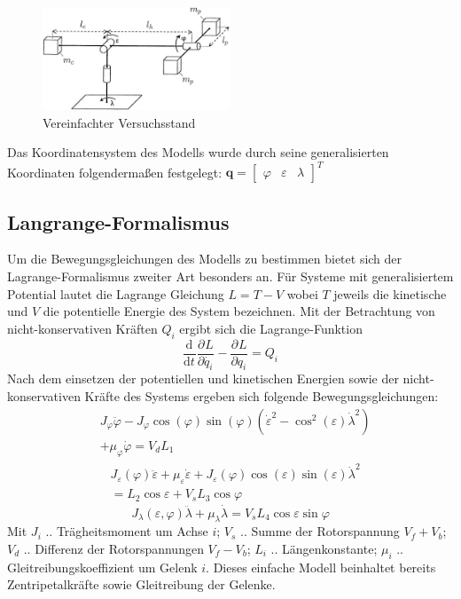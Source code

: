 \documentclass[times, 9pt,twocolumn]{article}
\newcommand{\partiell}[3][]{\frac{\partial^{#1}#2}{\partial{#3}^{#1}}}
\newcommand{\diff}[3][]{\frac{\mathrm{d}^{#1}#2}{\mathrm{d}{#3}^{#1}}}
\begin{document}
	\begin{figure}[ht]
		\centering
		\includegraphics[width=0.5\textwidth]{images/setup}
		\caption{Vereinfachter Versuchsstand}
		\label{setup}
	\end{figure}
	Das Koordinatensystem des Modells wurde durch seine generalisierten Koordinaten folgendermaßen festgelegt: $\bm q = \begin{bmatrix}
	\varphi & \varepsilon & \lambda
	\end{bmatrix}^T $

	\subsection{Langrange-Formalismus}

	Um die Bewegungsgleichungen des Modells zu bestimmen bietet sich der Lagrange-Formalismus zweiter Art besonders an. Für Systeme mit generalisiertem Potential lautet die Lagrange Gleichung $L = T -V$ wobei $T$ jeweils die kinetische und $V$ die potentielle Energie des System bezeichnen.
	Mit der Betrachtung von nicht-konservativen Kräften $Q_i$ ergibt sich die Lagrange-Funktion
	\begin{equation}\label{eq:lagrange}
	\diff{}{t} \partiell{L}{\dot{q_i}} - \partiell{L}{q_i}=Q_i
	\end{equation}
	Nach dem einsetzen der potentiellen und kinetischen Energien sowie der nicht-konservativen Kräfte des Systems ergeben sich folgende Bewegungsgleichungen:
	\begin{equation}
	\begin{split}
	&J_\varphi \ddot{\varphi} - J_\varphi \cos (\varphi) \sin (\varphi) (\dot{\varepsilon}^2- \cos^2 (\varepsilon) \dot{\lambda}^2)\\  &+ \mu_\varphi \dot{\varphi} = V_d L_1
	\end{split}
	\end{equation}
	\begin{equation}
	\begin{split}
	&J_\varepsilon(\varphi)\ddot{\varepsilon} + \mu_\varepsilon \dot{\varepsilon} + J_\varepsilon(\varphi) \cos (\varepsilon) \sin (\varepsilon) \dot{\lambda}^2\\
	&= L_2 \cos \varepsilon + V_s L_3 \cos \varphi
	\end{split}
	\end{equation}
	\begin{equation}
	J_\lambda(\varepsilon,\varphi) \ddot{\lambda} + \mu_\lambda \dot{\lambda} = V_s L_4 \cos \varepsilon \sin \varphi
	\end{equation}
	Mit $J_i$ .. Trägheitsmoment um Achse $i$; $V_s$ .. Summe der Rotorspannung $V_f + V_b$; $V_d$ .. Differenz der Rotorspannungen $V_f - V_b$; $L_i$ .. Längenkonstante; $\mu_i$ .. Gleitreibungskoeffizient um Gelenk $i$. Dieses einfache Modell beinhaltet bereits Zentripetalkräfte sowie Gleitreibung der Gelenke.
\end{document}
